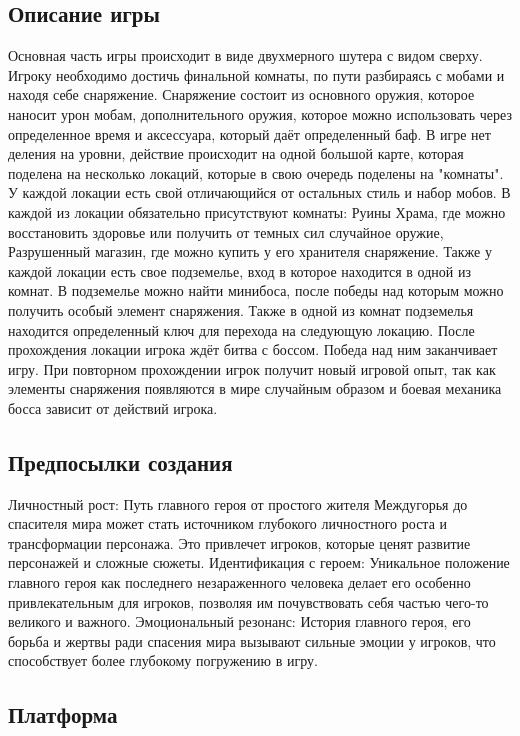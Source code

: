 \documentclass{article}
\begin{document}
\subsection{Описание игры}
Основная часть игры  происходит  в виде двухмерного шутера с видом сверху. Игроку необходимо достичь финальной комнаты, по пути разбираясь с мобами и находя себе снаряжение. Снаряжение состоит из основного оружия, которое наносит урон мобам, дополнительного оружия, которое можно использовать через определенное время и аксессуара, который даёт определенный баф.
В игре нет деления на уровни, действие происходит на одной большой карте, которая поделена на несколько локаций, которые в свою очередь поделены на "комнаты". 
У каждой локации есть свой отличающийся от остальных стиль и набор мобов. В каждой из локации обязательно присутствуют комнаты: Руины Храма, где можно восстановить здоровье или получить от темных сил случайное оружие, Разрушенный магазин, где можно купить у его хранителя снаряжение.
Также у каждой локации есть свое подземелье, вход в которое находится в одной из комнат. В подземелье можно найти минибоса, после победы над которым можно получить особый элемент снаряжения. Также в одной из комнат подземелья находится определенный ключ для перехода на следующую локацию. После прохождения локации игрока ждёт битва с боссом. Победа над ним заканчивает игру.
При повторном прохождении игрок получит новый игровой опыт, так как элементы снаряжения появляются в мире случайным образом и боевая механика босса зависит от действий игрока.

\subsection{Предпосылки создания}
Личностный рост: Путь главного героя от простого жителя Междугорья до спасителя мира может стать источником глубокого личностного роста и трансформации персонажа. Это привлечет игроков, которые ценят развитие персонажей и сложные сюжеты.
Идентификация с героем: Уникальное положение главного героя как последнего незараженного человека делает его особенно привлекательным для игроков, позволяя им почувствовать себя частью чего-то великого и важного.
Эмоциональный резонанс: История главного героя, его борьба и жертвы ради спасения мира вызывают сильные эмоции у игроков, что способствует более глубокому погружению в игру.

\subsection{Платформа}
\end{document}
